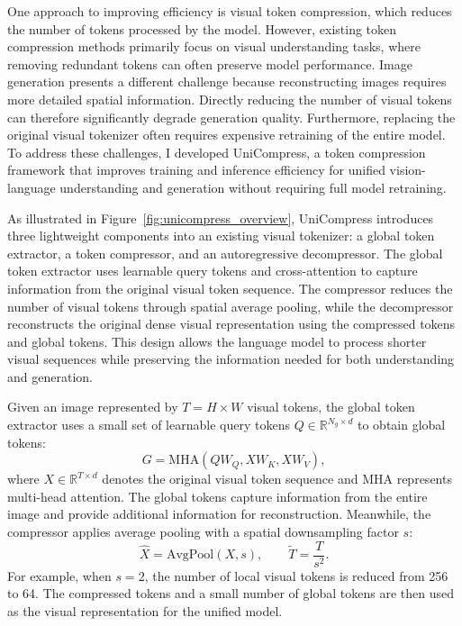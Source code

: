 \documentclass[11pt]{article}
\begin{document}
One approach to improving efficiency is visual token compression, which reduces the number of tokens processed by the model. However, existing token compression methods primarily focus on visual understanding tasks, where removing redundant tokens can often preserve model performance. Image generation presents a different challenge because reconstructing images requires more detailed spatial information. Directly reducing the number of visual tokens can therefore significantly degrade generation quality. Furthermore, replacing the original visual tokenizer often requires expensive retraining of the entire model. To address these challenges, I developed UniCompress, a token compression framework that improves training and inference efficiency for unified vision-language understanding and generation without requiring full model retraining.

As illustrated in Figure~\ref{fig:unicompress_overview}, UniCompress introduces three lightweight components into an existing visual tokenizer: a global token extractor, a token compressor, and an autoregressive decompressor. The global token extractor uses learnable query tokens and cross-attention to capture information from the original visual token sequence. The compressor reduces the number of visual tokens through spatial average pooling, while the decompressor reconstructs the original dense visual representation using the compressed tokens and global tokens. This design allows the language model to process shorter visual sequences while preserving the information needed for both understanding and generation.

Given an image represented by $T=H\times W$ visual tokens, the global token extractor uses a small set of learnable query tokens $Q\in\mathbb{R}^{N_g\times d}$ to obtain global tokens:
\begin{equation}
G=\mathrm{MHA}(QW_Q,XW_K,XW_V),
\label{eq:unicompress_global}
\end{equation}
where $X\in\mathbb{R}^{T\times d}$ denotes the original visual token sequence and MHA represents multi-head attention. The global tokens capture information from the entire image and provide additional information for reconstruction. Meanwhile, the compressor applies average pooling with a spatial downsampling factor $s$:
\begin{equation}
\hat{X}=\mathrm{AvgPool}(X,s),\qquad \tilde{T}=\frac{T}{s^2}.
\label{eq:unicompress_pooling}
\end{equation}
For example, when $s=2$, the number of local visual tokens is reduced from 256 to 64. The compressed tokens and a small number of global tokens are then used as the visual representation for the unified model.
\end{document}
